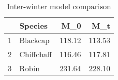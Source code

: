 \begin{table}[ht]
\centering
\begin{tabular}{rlrr}
  \hline
 & Species & M\_0 & M\_t \\ 
  \hline
1 & Blackcap & 118.12 & 113.53 \\ 
  2 & Chiffchaff & 116.46 & 117.81 \\ 
  3 & Robin & 231.64 & 228.10 \\ 
   \hline
\end{tabular}
\caption{Inter-winter model comparison} 
\label{tab:model_comparison_inter}
\end{table}
